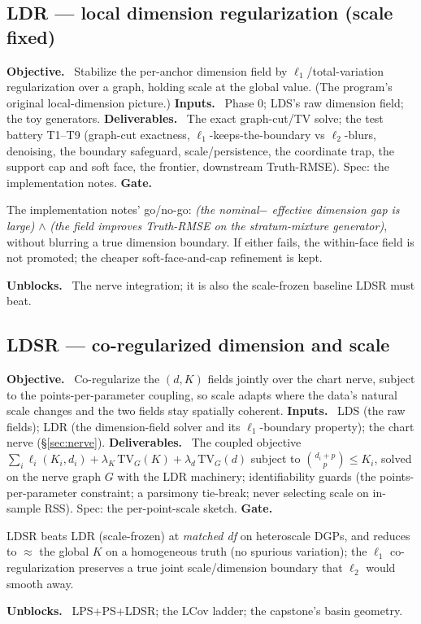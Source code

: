 \documentclass[11pt]{article}
\newcommand{\field}[1]{\smallskip\noindent\textbf{\textsf{#1.}}\ }
\begin{document}
\subsection{LDR --- local dimension regularization (scale fixed)}\label{sec:ldr}
\field{Objective} Stabilize the per-anchor dimension field by $\ell_1$/total-variation
regularization over a graph, holding scale at the global value. (The program's
original local-dimension picture.)
\field{Inputs} Phase 0; LDS's raw dimension field; the toy generators.
\field{Deliverables} The exact graph-cut/TV solve; the test battery T1--T9
(graph-cut exactness, $\ell_1$-keeps-the-boundary vs $\ell_2$-blurs, denoising, the
boundary safeguard, scale/persistence, the coordinate trap, the support cap and soft
face, the frontier, downstream Truth-RMSE). Spec: the implementation notes.
\field{Gate} \begin{gate} The implementation notes' go/no-go: \emph{(the nominal$-$
effective dimension gap is large)} $\wedge$ \emph{(the field improves Truth-RMSE on
the stratum-mixture generator)}, without blurring a true dimension boundary. If
either fails, the within-face field is not promoted; the cheaper soft-face-and-cap
refinement is kept.\end{gate}
\field{Unblocks} The nerve integration; it is also the scale-frozen baseline LDSR
must beat.

\subsection{LDSR --- co-regularized dimension and scale}\label{sec:ldsr}
\field{Objective} Co-regularize the $(d,K)$ fields jointly over the chart nerve,
subject to the points-per-parameter coupling, so scale adapts where the data's
natural scale changes and the two fields stay spatially coherent.
\field{Inputs} LDS (the raw fields); LDR (the dimension-field solver and its
$\ell_1$-boundary property); the chart nerve (\S\ref{sec:nerve}).
\field{Deliverables} The coupled objective
$\sum_i \ell_i(K_i,d_i) + \lambda_K\,\mathrm{TV}_G(K) + \lambda_d\,\mathrm{TV}_G(d)$
subject to $\binom{d_i+p}{p}\le K_i$, solved on the nerve graph $G$ with the LDR
machinery; identifiability guards (the points-per-parameter constraint; a parsimony
tie-break; never selecting scale on in-sample RSS). Spec: the per-point-scale sketch.
\field{Gate} \begin{gate} LDSR beats LDR (scale-frozen) at \emph{matched df} on
heteroscale DGPs, and reduces to $\approx$ the global $K$ on a homogeneous truth (no
spurious variation); the $\ell_1$ co-regularization preserves a true joint
scale/dimension boundary that $\ell_2$ would smooth away.\end{gate}
\field{Unblocks} LPS+PS+LDSR; the LCov ladder; the capstone's basin geometry.
\end{document}
